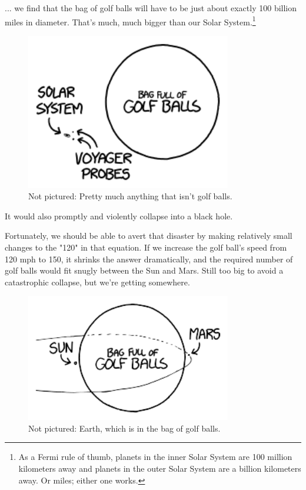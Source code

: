 {{... we find that the bag of golf balls will have to be just about exactly 100 billion miles in diameter. That's much, much bigger than our Solar System.{\footnote{As a Fermi rule of thumb, planets in the inner Solar System are 100 million kilometers away and planets in the outer Solar System are a billion kilometers away. Or miles; either one works.} } }

\begin{figure}[!htbp]
\centering
\includegraphics[scale=0.5, max width=0.8\textwidth]{imgs/a/85/golf_120.png}
\caption{Not pictured: Pretty much anything that isn't golf balls.}
\end{figure}

{It would also promptly and violently collapse into a black hole.}

{Fortunately, we should be able to avert that disaster by making relatively small changes to the "120" in that equation. If we increase the golf ball's speed from 120 mph to 150, it shrinks the answer dramatically, and the required number of golf balls would fit snugly between the Sun and Mars. Still too big to avoid a catastrophic collapse, but we're getting somewhere.}

\begin{figure}[!htbp]
\centering
\includegraphics[scale=0.5, max width=0.8\textwidth]{imgs/a/85/golf_150.png}
\caption{Not pictured: Earth, which is in the bag of golf balls.}
\end{figure}

}
